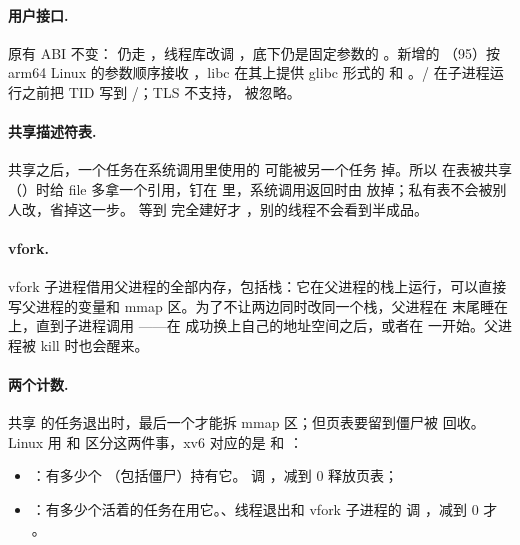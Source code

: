\paragraph{用户接口.} 原有 ABI 不变： 仍走 ，线程库改调 ，底下仍是固定参数的 。新增的 （95）按 arm64 Linux 的参数顺序接收 ，libc 在其上提供 glibc 形式的  和 。/ 在子进程运行之前把 TID 写到 /；TLS 不支持， 被忽略。

\paragraph{共享描述符表.}  共享之后，一个任务在系统调用里使用的  可能被另一个任务  掉。所以  在表被共享（）时给 file 多拿一个引用，钉在  里，系统调用返回时由  放掉；私有表不会被别人改，省掉这一步。 等到  完全建好才 ，别的线程不会看到半成品。

\paragraph{vfork.} vfork 子进程借用父进程的全部内存，包括栈：它在父进程的栈上运行，可以直接写父进程的变量和 mmap 区。为了不让两边同时改同一个栈，父进程在  末尾睡在  上，直到子进程调用 ——在  成功换上自己的地址空间之后，或者在  一开始。父进程被 kill 时也会醒来。

\paragraph{两个计数.} 共享  的任务退出时，最后一个才能拆 mmap 区；但页表要留到僵尸被  回收。Linux 用  和  区分这两件事，xv6 对应的是  和 ：

\begin{itemize}
  \item {}：有多少个 （包括僵尸）持有它。 调 ，减到 0 释放页表；
  \item {}：有多少个活着的任务在用它。、线程退出和 vfork 子进程的  调 ，减到 0 才 。
\end{itemize}

